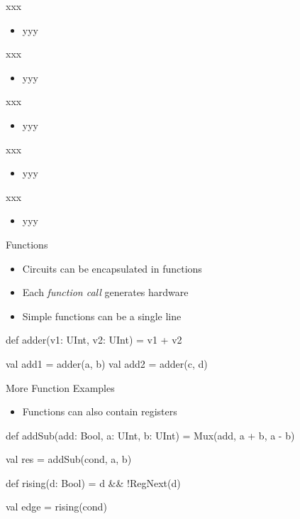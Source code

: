 \begin{frame}[fragile]{xxx}
\begin{itemize}
\item yyy
\end{itemize}
\end{frame}

\begin{frame}[fragile]{xxx}
\begin{itemize}
\item yyy
\end{itemize}
\end{frame}

\begin{frame}[fragile]{xxx}
\begin{itemize}
\item yyy
\end{itemize}
\end{frame}

\begin{frame}[fragile]{xxx}
\begin{itemize}
\item yyy
\end{itemize}
\end{frame}

\begin{frame}[fragile]{xxx}
\begin{itemize}
\item yyy
\end{itemize}
\end{frame}

\begin{frame}[fragile]{Functions}
\begin{itemize}
\item Circuits can be encapsulated in functions
\item Each \emph{function call} generates hardware
\item Simple functions can be a single line
\end{itemize}
\begin{chisel}
  def adder(v1: UInt, v2: UInt) = v1 + v2
  
  val add1 = adder(a, b)
  val add2 = adder(c, d)
\end{chisel}
\end{frame}

\begin{frame}[fragile]{More Function Examples}
\begin{itemize}
\item Functions can also contain registers
\end{itemize}
\begin{chisel}
  def addSub(add: Bool, a: UInt, b: UInt) =
    Mux(add, a + b, a - b)

  val res = addSub(cond, a, b)

  def rising(d: Bool) = d && !RegNext(d)

  val edge = rising(cond)
\end{chisel}
\end{frame}

